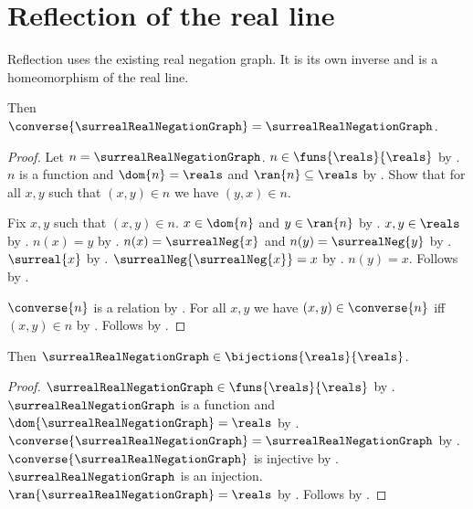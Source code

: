 \section{Reflection of the real line}





Reflection uses the existing real negation graph. It is its own inverse and
is a homeomorphism of the real line.

\begin{theorem}\label{real_reflection_converse}
    Then $\converse{\surrealRealNegationGraph}=\surrealRealNegationGraph$.
\end{theorem}
\begin{proof}
    Let $n=\surrealRealNegationGraph$.
    $n\in\funs{\reals}{\reals}$ by .
    $n$ is a function and $\dom{n}=\reals$ and $\ran{n}\subseteq\reals$ by
        .
    Show that for all $x,y$ such that $(x,y)\in n$ we have $(y,x)\in n$.
    \begin{subproof}
        Fix $x,y$ such that $(x,y)\in n$.
        $x\in\dom{n}$ and $y\in\ran{n}$ by .
        $x,y\in\reals$ by .
        $n(x)=y$ by .
        $n(x)=\surrealNeg{x}$ and $n(y)=\surrealNeg{y}$ by
            .
        $\surreal{x}$ by .
        $\surrealNeg{\surrealNeg{x}}=x$ by .
        $n(y)=x$.
        Follows by .
    \end{subproof}
    $\converse{n}$ is a relation by .
For all $x,y$ we have $(x,y)\in\converse{n}$ iff $(x,y)\in n$ by
        .
    Follows by .
\end{proof}

\begin{theorem}\label{real_reflection_bijection}
    Then $\surrealRealNegationGraph\in\bijections{\reals}{\reals}$.
\end{theorem}
\begin{proof}
    $\surrealRealNegationGraph\in\funs{\reals}{\reals}$ by
        .
    $\surrealRealNegationGraph$ is a function and
        $\dom{\surrealRealNegationGraph}=\reals$ by .
    $\converse{\surrealRealNegationGraph}=\surrealRealNegationGraph$ by
        .
    $\converse{\surrealRealNegationGraph}$ is injective by
        .
    $\surrealRealNegationGraph$ is an injection.
    $\ran{\surrealRealNegationGraph}=\reals$ by .
    Follows by .
\end{proof}

